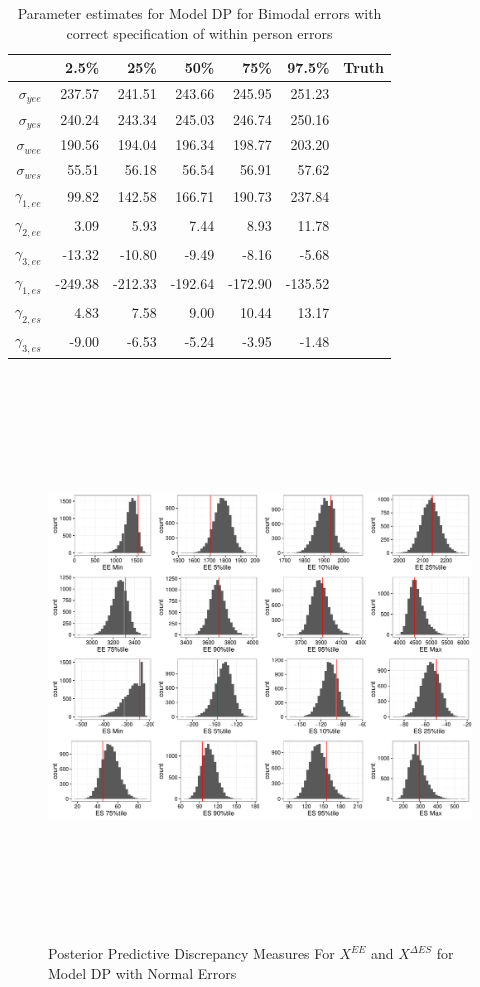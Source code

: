 \documentclass[11pt]{article}\usepackage[]{graphicx}\usepackage[]{color}
\begin{document}
\begin{table}[ht]
\centering
\begin{tabular}{rrrrrr|r}
  \hline
 & 2.5\% & 25\% & 50\% & 75\% & 97.5\% & Truth \\
  \hline
$\sigma_{yee}$ & 237.57 & 241.51 & 243.66 & 245.95 & 251.23 \\ 
  $\sigma_{yes}$ & 240.24 & 243.34 & 245.03 & 246.74 & 250.16 \\ 
  $\sigma_{wee}$ & 190.56 & 194.04 & 196.34 & 198.77 & 203.20 \\ 
  $\sigma_{wes}$ & 55.51 & 56.18 & 56.54 & 56.91 & 57.62 \\ 
  $\gamma_{1,ee}$ & 99.82 & 142.58 & 166.71 & 190.73 & 237.84 \\ 
  $\gamma_{2,ee}$ & 3.09 & 5.93 & 7.44 & 8.93 & 11.78 \\ 
  $\gamma_{3,ee}$ & -13.32 & -10.80 & -9.49 & -8.16 & -5.68 \\ 
  $\gamma_{1,es}$ & -249.38 & -212.33 & -192.64 & -172.90 & -135.52 \\ 
  $\gamma_{2,es}$ & 4.83 & 7.58 & 9.00 & 10.44 & 13.17 \\ 
  $\gamma_{3,es}$ & -9.00 & -6.53 & -5.24 & -3.95 & -1.48 \\ 
   \hline
\end{tabular}
\caption{Parameter estimates for Model DP for Bimodal errors with correct specification of within person errors}
\label{mdpbwpestimates}
\end{table}
% 
% 
 \begin{figure}
  \centering
  \includegraphics[width=17cm,height=15cm]{manual_figure/wpxdiagdp20.pdf}
  \caption{Posterior Predictive Discrepancy Measures For $X^{EE}$ and $X^{\Delta ES}$ for Model DP with Normal Errors}
  \label{wpxdiagdp}
  \end{figure}
\end{document}
